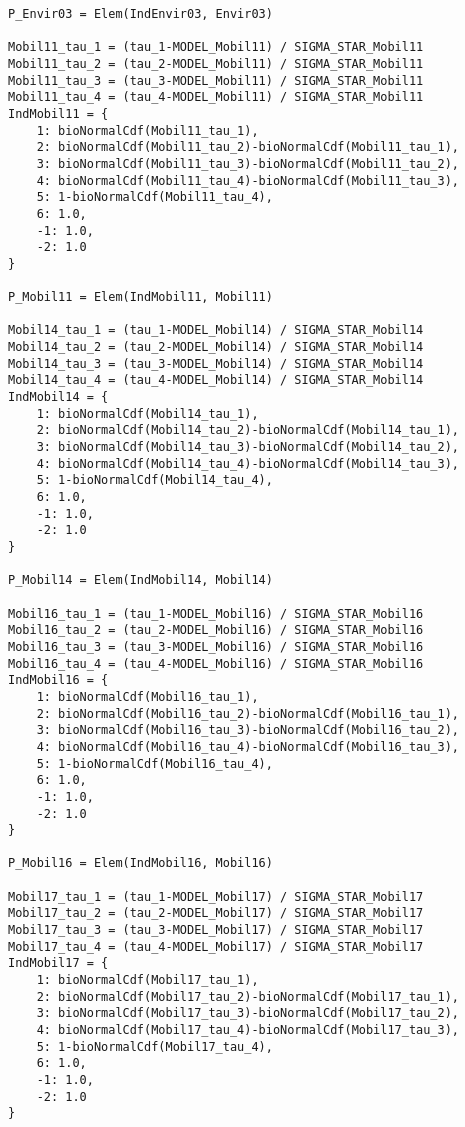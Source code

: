 \documentclass[12pt,a4paper]{article}
\begin{document}
\begin{lstlisting}[style=numbers]
P_Envir03 = Elem(IndEnvir03, Envir03)

Mobil11_tau_1 = (tau_1-MODEL_Mobil11) / SIGMA_STAR_Mobil11
Mobil11_tau_2 = (tau_2-MODEL_Mobil11) / SIGMA_STAR_Mobil11
Mobil11_tau_3 = (tau_3-MODEL_Mobil11) / SIGMA_STAR_Mobil11
Mobil11_tau_4 = (tau_4-MODEL_Mobil11) / SIGMA_STAR_Mobil11
IndMobil11 = {
    1: bioNormalCdf(Mobil11_tau_1),
    2: bioNormalCdf(Mobil11_tau_2)-bioNormalCdf(Mobil11_tau_1),
    3: bioNormalCdf(Mobil11_tau_3)-bioNormalCdf(Mobil11_tau_2),
    4: bioNormalCdf(Mobil11_tau_4)-bioNormalCdf(Mobil11_tau_3),
    5: 1-bioNormalCdf(Mobil11_tau_4),
    6: 1.0,
    -1: 1.0,
    -2: 1.0
}

P_Mobil11 = Elem(IndMobil11, Mobil11)

Mobil14_tau_1 = (tau_1-MODEL_Mobil14) / SIGMA_STAR_Mobil14
Mobil14_tau_2 = (tau_2-MODEL_Mobil14) / SIGMA_STAR_Mobil14
Mobil14_tau_3 = (tau_3-MODEL_Mobil14) / SIGMA_STAR_Mobil14
Mobil14_tau_4 = (tau_4-MODEL_Mobil14) / SIGMA_STAR_Mobil14
IndMobil14 = {
    1: bioNormalCdf(Mobil14_tau_1),
    2: bioNormalCdf(Mobil14_tau_2)-bioNormalCdf(Mobil14_tau_1),
    3: bioNormalCdf(Mobil14_tau_3)-bioNormalCdf(Mobil14_tau_2),
    4: bioNormalCdf(Mobil14_tau_4)-bioNormalCdf(Mobil14_tau_3),
    5: 1-bioNormalCdf(Mobil14_tau_4),
    6: 1.0,
    -1: 1.0,
    -2: 1.0
}

P_Mobil14 = Elem(IndMobil14, Mobil14)

Mobil16_tau_1 = (tau_1-MODEL_Mobil16) / SIGMA_STAR_Mobil16
Mobil16_tau_2 = (tau_2-MODEL_Mobil16) / SIGMA_STAR_Mobil16
Mobil16_tau_3 = (tau_3-MODEL_Mobil16) / SIGMA_STAR_Mobil16
Mobil16_tau_4 = (tau_4-MODEL_Mobil16) / SIGMA_STAR_Mobil16
IndMobil16 = {
    1: bioNormalCdf(Mobil16_tau_1),
    2: bioNormalCdf(Mobil16_tau_2)-bioNormalCdf(Mobil16_tau_1),
    3: bioNormalCdf(Mobil16_tau_3)-bioNormalCdf(Mobil16_tau_2),
    4: bioNormalCdf(Mobil16_tau_4)-bioNormalCdf(Mobil16_tau_3),
    5: 1-bioNormalCdf(Mobil16_tau_4),
    6: 1.0,
    -1: 1.0,
    -2: 1.0
}

P_Mobil16 = Elem(IndMobil16, Mobil16)

Mobil17_tau_1 = (tau_1-MODEL_Mobil17) / SIGMA_STAR_Mobil17
Mobil17_tau_2 = (tau_2-MODEL_Mobil17) / SIGMA_STAR_Mobil17
Mobil17_tau_3 = (tau_3-MODEL_Mobil17) / SIGMA_STAR_Mobil17
Mobil17_tau_4 = (tau_4-MODEL_Mobil17) / SIGMA_STAR_Mobil17
IndMobil17 = {
    1: bioNormalCdf(Mobil17_tau_1),
    2: bioNormalCdf(Mobil17_tau_2)-bioNormalCdf(Mobil17_tau_1),
    3: bioNormalCdf(Mobil17_tau_3)-bioNormalCdf(Mobil17_tau_2),
    4: bioNormalCdf(Mobil17_tau_4)-bioNormalCdf(Mobil17_tau_3),
    5: 1-bioNormalCdf(Mobil17_tau_4),
    6: 1.0,
    -1: 1.0,
    -2: 1.0
}


\end{lstlisting}
\end{document}
